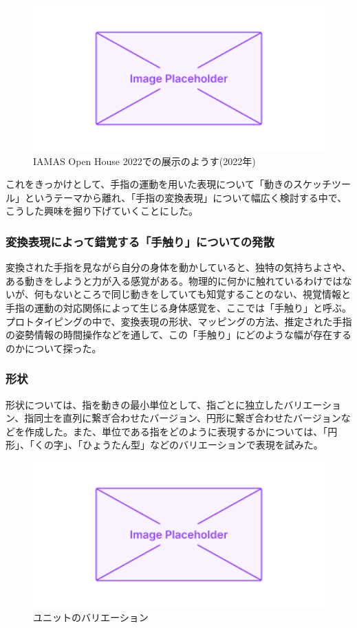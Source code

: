 \begin{figure}[H]
  \centering
  \includegraphics[width=15cm]{img/placeholder.png}
  \caption{IAMAS Open House 2022での展示のようす(2022年)}
  \label{fig:exhibit_2022}
\end{figure}

これをきっかけとして、手指の運動を用いた表現について「動きのスケッチツール」というテーマから離れ、「手指の変換表現」について幅広く検討する中で、こうした興味を掘り下げていくことにした。\\

\subsubsection{変換表現によって錯覚する「手触り」についての発散}
変換された手指を見ながら自分の身体を動かしていると、独特の気持ちよさや、ある動きをしようと力が入る感覚がある。物理的に何かに触れているわけではないが、何もないところで同じ動きをしていても知覚することのない、視覚情報と手指の運動の対応関係によって生じる身体感覚を、ここでは「手触り」と呼ぶ。
プロトタイピングの中で、変換表現の形状、マッピングの方法、推定された手指の姿勢情報の時間操作などを通して、この「手触り」にどのような幅が存在するのかについて探った。
\subsubsection*{形状}
形状については、指を動きの最小単位として、指ごとに独立したバリエーション、指同士を直列に繋ぎ合わせたバージョン、円形に繋ぎ合わせたバージョンなどを作成した。また、単位である指をどのように表現するかについては、「円形」、「くの字」、「ひょうたん型」などのバリエーションで表現を試みた。
\begin{figure}[H]
  \centering
  \includegraphics[width=15cm]{img/placeholder.png}
  \caption{ユニットのバリエーション}
  \label{fig:unit_valiation}
\end{figure}
